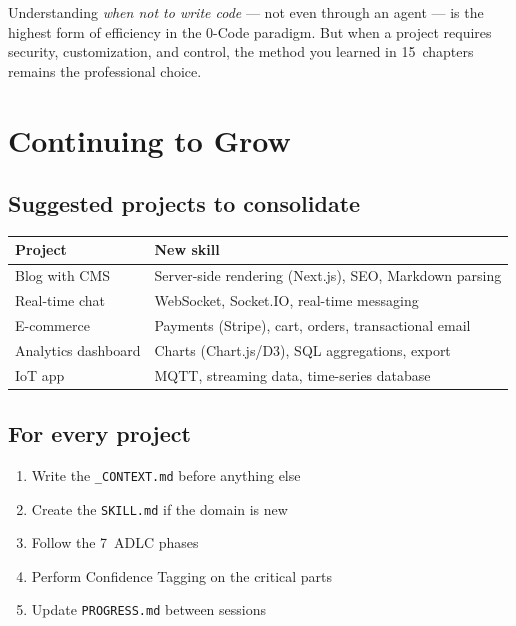 \begin{notebox}
Understanding \textit{when not to write code} --- not even through an agent --- is the highest form of efficiency in the 0-Code paradigm. But when a project requires security, customization, and control, the method you learned in 15~chapters remains the professional choice.
\end{notebox}

\section{Continuing to Grow}

\subsection{Suggested projects to consolidate}

\begin{center}
\begin{tabularx}{\textwidth}{l X}
\toprule
\textbf{Project} & \textbf{New skill} \\
\midrule
Blog with CMS & Server-side rendering (Next.js), SEO, Markdown parsing \\
Real-time chat & WebSocket, Socket.IO, real-time messaging \\
E-commerce & Payments (Stripe), cart, orders, transactional email \\
Analytics dashboard & Charts (Chart.js/D3), SQL aggregations, export \\
IoT app & MQTT, streaming data, time-series database \\
\bottomrule
\end{tabularx}
\end{center}

\subsection{For every project}

\begin{enumerate}
  \item Write the \texttt{\_CONTEXT.md} before anything else
  \item Create the \texttt{SKILL.md} if the domain is new
  \item Follow the 7~ADLC phases
  \item Perform Confidence Tagging on the critical parts
  \item Update \texttt{PROGRESS.md} between sessions
\end{enumerate}

